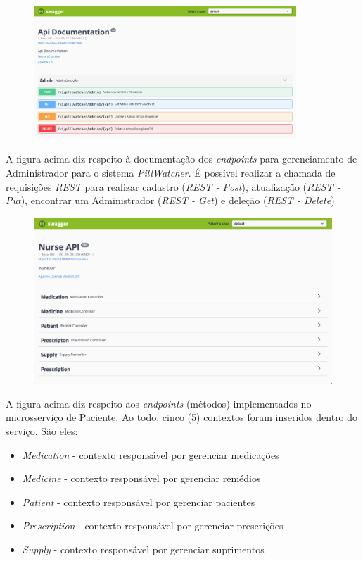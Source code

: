 \begin{apendicesenv}
\begin{figure}[H]
    \centering
    \includegraphics[width=0.88\textwidth,page=1]{figuras/software/SwaggerUi/SwaggerUi_Admin.png}
    \label{fig:swagger_admin}
\end{figure}

A figura acima diz respeito à documentação dos \textit{endpoints} para gerenciamento de Administrador para o sistema \textit{PillWatcher}. É possível realizar a chamada de requisições \textit{REST} para realizar cadastro (\textit{REST - Post}), atualização (\textit{REST - Put}), encontrar um Administrador (\textit{REST - Get}) e deleção (\textit{REST - Delete})

\begin{figure}[H]
    \centering
    \includegraphics[width=1.0\textwidth,page=1]{figuras/software/SwaggerUi/SwaggerUI_NursingMs.png}
    \label{fig:nursing_png}
\end{figure}

A figura acima diz respeito aos \textit{endpoints} (métodos) implementados no microsserviço de Paciente. Ao todo, cinco (5) contextos foram inseridos dentro do serviço. São eles:

\begin{itemize}
    \item \textit{Medication} - contexto responsável por gerenciar medicações
    \item \textit{Medicine} - contexto responsável por gerenciar remédios
    \item \textit{Patient} - contexto responsável por gerenciar pacientes
    \item \textit{Prescription} - contexto responsável por gerenciar prescrições
    \item \textit{Supply} - contexto responsável por gerenciar suprimentos 
\end{itemize}


\end{apendicesenv}
